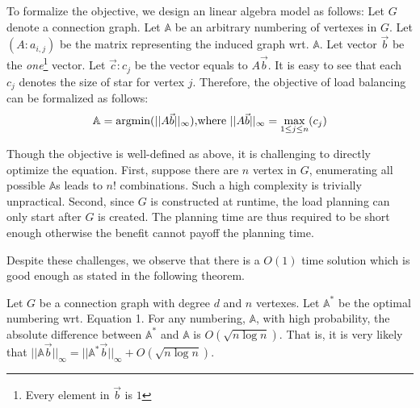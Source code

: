To formalize the objective, we design an linear algebra model as follows: Let $G$ denote a connection graph.
Let $\mathbb{A}$ be an arbitrary numbering of vertexes in $G$.
Let $(A:a_{i,j})$ be the matrix representing the induced graph wrt. $\mathbb{A}$. Let vector $\vec{b}$
be the \textit{one}\footnote{Every element in $\vec{b}$ is $1$} vector. Let $\vec{c}:c_j$ be the
vector equals to $A\vec{b}$. It is easy to see that each $c_j$ denotes the size of star for vertex $j$.
Therefore, the objective of load balancing can be formalized as follows:
\begin{equation}
\mathbb{A}  = \operatorname*{argmin}(||A\vec{b}||_\infty) \text{,where } ||A\vec{b}||_\infty = \max_{1\leq j \leq n}(c_j)
\end{equation}

Though the objective is well-defined as above, it is challenging to directly optimize
the equation. First, suppose there are $n$ vertex in $G$, enumerating
all possible $\mathbb{A}$s leads to $n!$ combinations. 
Such a high complexity is trivially unpractical. Second,
since $G$ is constructed at runtime, 
the load planning can only start after $G$ is created. 
The planning time are thus required to be short enough otherwise the benefit cannot payoff the planning time.

Despite these challenges, we observe that there is a 
$O(1)$ time solution which is good enough as stated in the 
following theorem.

\begin{theorem}
Let $G$ be a connection graph with degree $d$ and $n$ vertexes.
Let $\mathbb{A}^*$ be the optimal numbering wrt. Equation 1.
For any numbering, $\mathbb{A}$, with high probability, the 
absolute difference between $\mathbb{A}^*$ and $\mathbb{A}$ is $O(\sqrt{n \log n})$.
That is, it is very likely that 
$||\mathbb{A}\vec{b}||_\infty = ||\mathbb{A}^*\vec{b}||_\infty + O(\sqrt{n \log n})$.
\end{theorem}

